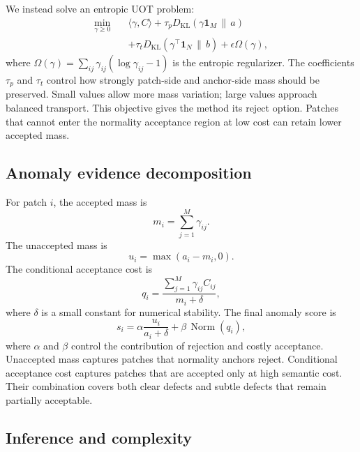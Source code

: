 \documentclass[10pt]{article}
\begin{document}
We instead solve an entropic UOT problem:
\begin{equation}
\begin{split}
    \min_{\gamma \geq 0} \quad
    &\langle \gamma, C \rangle
    + \tau_{p} D_{\mathrm{KL}}(\gamma \mathbf{1}_{M} \,\|\, a) \\
    &+ \tau_{t} D_{\mathrm{KL}}(\gamma^{\top}\mathbf{1}_{N} \,\|\, b)
    + \epsilon \Omega(\gamma),
\end{split}
\label{eq:uot}
\end{equation}
where $\Omega(\gamma)=\sum_{ij}\gamma_{ij}(\log \gamma_{ij}-1)$ is the entropic regularizer.
The coefficients $\tau_p$ and $\tau_t$ control how strongly patch-side and anchor-side mass should be preserved.
Small values allow more mass variation; large values approach balanced transport.
This objective gives the method its reject option.
Patches that cannot enter the normality acceptance region at low cost can retain lower accepted mass.

\subsection{Anomaly evidence decomposition}

For patch $i$, the accepted mass is
\begin{equation}
    m_i = \sum_{j=1}^{M} \gamma_{ij}.
\end{equation}
The unaccepted mass is
\begin{equation}
    u_i = \max(a_i - m_i, 0).
\end{equation}
The conditional acceptance cost is
\begin{equation}
    q_i =
    \frac{\sum_{j=1}^{M} \gamma_{ij} C_{ij}}{m_i + \delta},
\end{equation}
where $\delta$ is a small constant for numerical stability.
The final anomaly score is
\begin{equation}
    s_i = \alpha \frac{u_i}{a_i+\delta} + \beta \,\operatorname{Norm}(q_i),
\end{equation}
where $\alpha$ and $\beta$ control the contribution of rejection and costly acceptance.
Unaccepted mass captures patches that normality anchors reject.
Conditional acceptance cost captures patches that are accepted only at high semantic cost.
Their combination covers both clear defects and subtle defects that remain partially acceptable.

\subsection{Inference and complexity}
\end{document}

